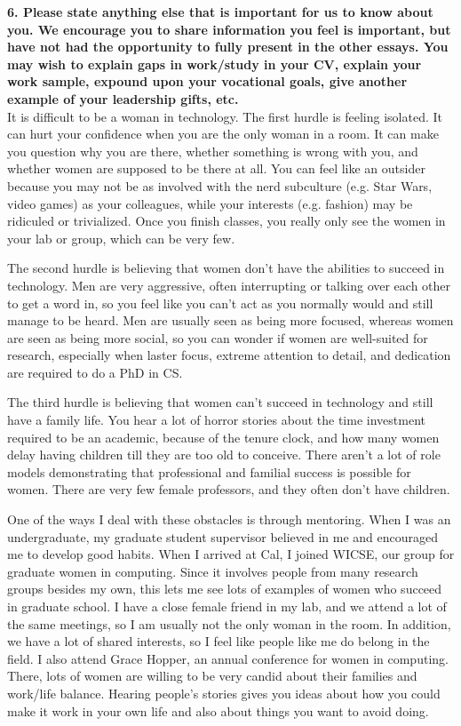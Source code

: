 \documentclass{article}
\begin{document}
\pagestyle{plain}

\noindent\textbf{6.  Please state anything else that is important for us to know about you. We encourage you to share information you feel is important, but have not had the opportunity to fully present in the other essays. You may wish to explain gaps in work/study in your CV, explain your work sample, expound upon your vocational goals, give another example of your leadership gifts, etc.}\\

It is difficult to be a woman in technology.
The first hurdle is feeling isolated.
It can hurt your confidence when you are the only woman in a room.
It can make you question why you are there, whether something is wrong with you, and whether women are supposed to be there at all.
You can feel like an outsider because you may not be as involved with the nerd subculture (e.g. Star Wars, video games) as your colleagues, while your interests (e.g. fashion) may be ridiculed or trivialized.
Once you finish classes, you really only see the women in your lab or group, which can be very few.

The second hurdle is believing that women don't have the abilities to succeed in technology.
Men are very aggressive, often interrupting or talking over each other to get a word in, so you feel like you can't act as you normally would and still manage to be heard.
Men are usually seen as being more focused, whereas women are seen as being more social, so you can wonder if women are well-suited for research, especially when laster focus, extreme attention to detail, and dedication are required to do a PhD in CS.

The third hurdle is believing that women can't succeed in technology and still have a family life.
You hear a lot of horror stories about the time investment required to be an academic, because of the tenure clock, and how many women delay having children till they are too old to conceive.
There aren't a lot of role models demonstrating that professional and familial success is possible for women.
There are very few female professors, and they often don't have children.

One of the ways I deal with these obstacles is through mentoring.
When I was an undergraduate, my graduate student supervisor believed in me and encouraged me to develop good habits.
When I arrived at Cal, I joined WICSE, our group for graduate women in computing.
Since it involves people from many research groups besides my own, this lets me see lots of examples of women who succeed in graduate school.
I have a close female friend in my lab, and we attend a lot of the same meetings, so I am usually not the only woman in the room.
In addition, we have a lot of shared interests, so I feel like people like me do belong in the field.
I also attend Grace Hopper, an annual conference for women in computing.
There, lots of women are willing to be very candid about their families and work/life balance.
Hearing people's stories gives you ideas about how you could make it work in your own life and also about things you want to avoid doing.
\end{document}
